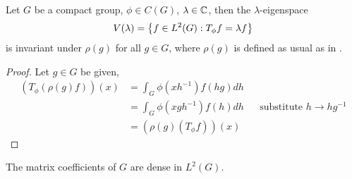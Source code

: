 \begin{prop} \label{Tphi-invariant}
  Let $G$ be a compact group, $\phi \in C(G)$, $\lambda \in \operatorname{\mathbb{C}}$, then the
  $\lambda$-eigenspace
  \[
    V(\lambda) = \left\{ f \in L^2(G) : T_{\phi}f = \lambda f \right\}
  \]
  is invariant under $\rho(g)$ for all $g \in G$, where $\rho(g)$ is defined as
  usual as in .
\end{prop}

\begin{proof}
  Let $g \in G$ be given,
  \begin{align*}
    (T_{\phi}(\rho(g)f))(x)
    & = \int_G \phi(xh^{-1}) f(hg) dh\\
    & = \int_G \phi(xgh^{-1}) f(h) dh && \text{substitute } h \to hg^{-1}\\
    & = (\rho(g)(T_{\phi}f))(x)
  \end{align*}
\end{proof}

\begin{thm} \label{peter-weyl-1}
  The matrix coefficients of $G$ are dense in $L^2(G)$.
\end{thm}

